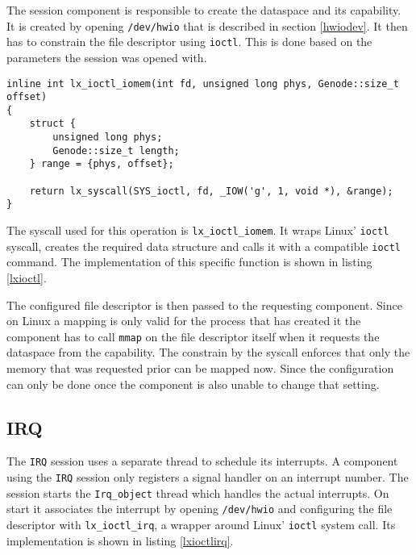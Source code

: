 \documentclass[
a4paper,
12pt,
notitlepage,
parskip=half,
DIV=11,
]{scrbook}
\begin{document}
		The session component is responsible to create the dataspace and its capability.
		It is created by opening \texttt{/dev/hwio} that is described in section \ref{hwiodev}.
		It then has to constrain the file descriptor using \texttt{ioctl}.
		This is done based on the parameters the session was opened with.
		
		\begin{lstlisting}[basicstyle=\ttfamily\footnotesize]
inline int lx_ioctl_iomem(int fd, unsigned long phys, Genode::size_t offset)
{
	struct {
		unsigned long phys;
		Genode::size_t length;
	} range = {phys, offset};

	return lx_syscall(SYS_ioctl, fd, _IOW('g', 1, void *), &range);
}
		\end{lstlisting}
		
		The syscall used for this operation is \texttt{lx\_ioctl\_iomem}.
		It wraps Linux' \texttt{ioctl} syscall, creates the required data structure and calls it with a compatible \texttt{ioctl} command.
		The implementation of this specific function is shown in listing \ref{lxioctl}.
		
		The configured file descriptor is then passed to the requesting component.
		Since on Linux a mapping is only valid for the process that has created it the component has to call \texttt{mmap} on the file descriptor itself when it requests the dataspace from the capability.
		The constrain by the syscall enforces that only the memory that was requested prior can be mapped now.
		Since the configuration can only be done once the component is also unable to change that setting.
		
		\subsection{IRQ}
		
		The \texttt{IRQ} session uses a separate thread to schedule its interrupts.
		A component using the \texttt{IRQ} session only registers a signal handler on an interrupt number.
		The session starts the \texttt{Irq\_object} thread which handles the actual interrupts.
		On start it associates the interrupt by opening \texttt{/dev/hwio} and configuring the file descriptor with \texttt{lx\_ioctl\_irq}, a wrapper around Linux' \texttt{ioctl} system call.
		Its implementation is shown in listing \ref{lxioctlirq}.
		
\end{document}
